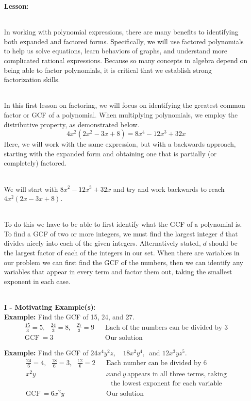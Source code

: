 \documentclass[12pt]{article}
\theoremstyle{definition}
\begin{document}
{\bf Lesson:}\\
\ \par
In working with polynomial expressions, there are many benefits to identifying both expanded and factored forms.  Specifically, we will use factored polynomials to help us solve equations, learn behaviors of graphs, and understand more complicated rational expressions.  Because so many concepts in algebra depend on being able to factor polynomials, it is critical that we establish strong factorization skills.\\
\ \par
In this first lesson on factoring, we will focus on identifying the greatest common factor or GCF of a polynomial.  When multiplying polynomials, we employ the distributive property, as demonstrated below.
$$4 x^2 (2 x^2 - 3 x + 8) = 8 x^4 - 12 x^3 + 32 x$$
Here, we will work with the same expression, but with a backwards approach, starting with the expanded form and obtaining one that is partially (or completely) factored.\\
\ \par
We will start with $8 x^2 - 12 x^3 + 32 x$ and try and work backwards to reach $4 x^2 (2 x - 3 x + 8)$.\\
\ \par
To do this we have to be able to first identify what the GCF of a
polynomial is. To find a GCF of two or more integers, we must find the largest integer $d$ that divides nicely into each of the given integers.  Alternatively stated, $d$ should be the largest factor of each of the integers in our set.  When there are variables in our problem we can first find the GCF of the numbers, then we can identify any variables that appear in every term and factor them out, taking the smallest exponent in each case.\\
\ \par
{\bf I - Motivating Example(s):}\\

{\bf Example:} Find the GCF of 15, 24, and 27.
  \begin{eqnarray*}
    \frac{15}{3} = 5,~~~ \frac{24}{3} = 8,~~~ \frac{27}{3} = 9 &  & \text{Each of the numbers can be divided by 3}\\
    \text{GCF} \ = 3 &  & \text{Our solution}
  \end{eqnarray*}

{\bf Example:} Find the GCF of $24 x^4 y^2 z,$~~$18 x^2 y^4,$~and $12 x^3 y z^5$.
  \begin{eqnarray*}
    \frac{24}{6} = 4,~~~ \frac{18}{6} = 3,~~~ \frac{12}{6} = 2 &  & \text{Each number can be divided by 6}\\
    x^2 y &  & x \text{and} \ y \ \text{appears in all three terms, taking}\\
		& & ~~~\text{the lowest exponent for each variable}\\
    \text{GCF} \ = 6 x^2 y &  & \text{Our solution}
  \end{eqnarray*}
\end{document}
